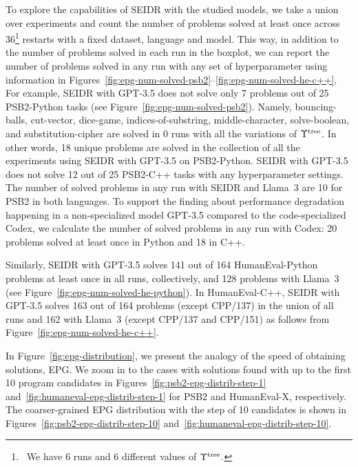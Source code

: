 To explore the capabilities of SEIDR with the studied models, we take a union over experiments and count the number of problems solved at least once across 36\footnote{~We have 6 runs and 6 different values of $\Upsilon^\text{tree}.$} restarts with a fixed dataset, language and model.
This way, in addition to the number of problems solved in each run in the boxplot, we can report the number of problems solved in any run with any set of hyperparameter using information in Figures~\ref{fig:epg-num-solved-psb2}--\ref{fig:epg-num-solved-he-c++}.
For example, SEIDR with GPT-3.5 does not solve only 7 problems out of 25 PSB2-Python tasks (see Figure~\ref{fig:epg-num-solved-psb2}).
Namely, bouncing-balls, cut-vector, dice-game, indices-of-substring, middle-character, solve-boolean, and substitution-cipher are solved in 0 runs with all the variations of $\Upsilon^\text{tree}$.
In other words, 18 unique problems are solved in the collection of all the experiments using SEIDR with GPT-3.5 on PSB2-Python. 
SEIDR with GPT-3.5 does not solve 12 out of 25 PSB2-C++ tasks with any hyperparameter settings. 
The number of solved problems in any run with SEIDR and Llama~3 are 10 for PSB2 in both languages. 
To support the finding about performance degradation happening in a non-specialized model GPT-3.5 compared to the code-specialized Codex, we calculate the number of solved problems in any run with Codex: 20 problems solved at least once in Python and 18 in C++. 

Similarly, SEIDR with GPT-3.5 solves 141 out of 164 HumanEval-Python problems at least once in all runs, collectively, and 128 problems with Llama~3 (see Figure~\ref{fig:epg-num-solved-he-python}).
In HumanEval-C++, SEIDR with GPT-3.5 solves 163 out of 164 problems (except CPP/137) in the union of all runs and 162 with Llama~3 (except CPP/137 and CPP/151) as follows from Figure~\ref{fig:epg-num-solved-he-c++}.


In Figure~\ref{fig:epg-distribution}, we present the analogy of the speed of obtaining solutions, EPG. 
We zoom in to the cases with solutions found with up to the first 10 program candidates in Figures~\ref{fig:psb2-epg-distrib-step-1} and~\ref{fig:humaneval-epg-distrib-step-1} for PSB2 and HumanEval-X, respectively. 
The coarser-grained EPG distribution with the step of 10 candidates is shown in Figures~\ref{fig:psb2-epg-distrib-step-10} and~\ref{fig:humaneval-epg-distrib-step-10}. 


